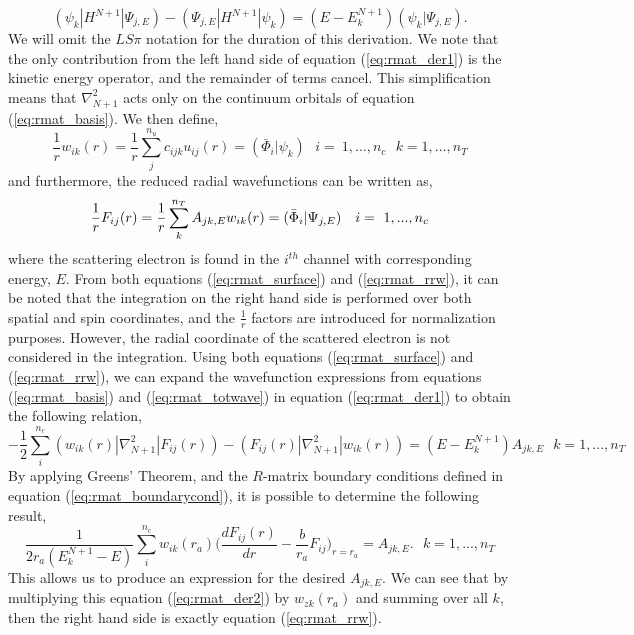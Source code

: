\begin{equation}\label{eq:rmat_der1}
(\psi_k|H^{N+1}|\Psi_{j,E})-(\Psi_{j,E}|H^{N+1}|\psi_k)=(E-E^{N+1}_k)(\psi_k | \Psi_{j,E}).
\end{equation}
We will omit the $LS\pi$ notation for the duration of this derivation. We note that the only contribution from the left hand side of equation (\ref{eq:rmat_der1}) is the kinetic energy operator, and the remainder of terms cancel. This simplification means that $\nabla_{N+1}^2$ acts only on the continuum orbitals of equation (\ref{eq:rmat_basis}). We then define,
\begin{equation}\label{eq:rmat_surface}
\frac{1}{r}w_{ik}(r)=\frac{1}{r}\sum_{j}^{n_u}c_{ijk}u_{ij}(r)=(\bar{\Phi}_i | \psi_k) ~~~ i=~1,...,n_c  ~~~ k=1,...,n_T
\end{equation}
and furthermore, the reduced radial wavefunctions can be written as,
\begin{equation}{\label{eq:rmat_rrw}}
\frac{1}{r}F_{ij}(r)=\frac{1}{r}\sum_{k}^{n_T}A_{jk,E}w_{ik}(r)=(\bar{\Phi}_i | \Psi_{j,E}) ~~~ i=~1,...,n_c
\end{equation}
where the scattering electron is found in the $i^{th}$ channel with corresponding energy, $E$. From both equations (\ref{eq:rmat_surface}) and (\ref{eq:rmat_rrw}), it can be noted that the integration on the right hand side is performed over both spatial and spin coordinates, and the $\frac{1}{r}$ factors are introduced for normalization purposes. However, the radial coordinate of the scattered electron is not considered in the integration. Using both equations (\ref{eq:rmat_surface}) and (\ref{eq:rmat_rrw}), we can expand the wavefunction expressions from equations (\ref{eq:rmat_basis}) and (\ref{eq:rmat_totwave}) in equation (\ref{eq:rmat_der1}) to obtain the following relation,
\[
-\frac{1}{2}\sum^{n_c}_i(w_{ik}(r) | \nabla_{N+1}^2 | F_{ij}(r) ) - (F_{ij}(r) | \nabla_{N+1}^2 | w_{ik}(r)) = (E-E^{N+1}_k)A_{jk,E} ~~~ k=1,...,n_T
\]
By applying Greens' Theorem, and the $R$-matrix boundary conditions defined in equation (\ref{eq:rmat_boundarycond}), it is possible to determine the following result,
\begin{equation}\label{eq:rmat_der2}
\frac{1}{2r_a(E^{N+1}_k-E)}\sum_{i}^{n_c}w_{ik}(r_a)\Big(\frac{dF_{ij}(r)}{dr}-\frac{b}{r_a}F_{ij}\Big)_{r=r_a}=A_{jk,E}. ~~~ k=1,...,n_T
\end{equation}
This allows us to produce an expression for the desired $A_{jk,E}$. We can see that by multiplying this equation (\ref{eq:rmat_der2}) by $w_{zk}(r_a)$ and summing over all $k$, then the right hand side is exactly equation (\ref{eq:rmat_rrw}).

